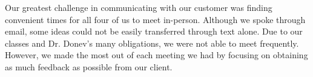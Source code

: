 \documentclass[11pt,a4paper]{article}
\begin{document}
Our greatest challenge in communicating with our customer was finding convenient times for all four of us to meet in-person. Although we spoke through email, some ideas could not be easily transferred through text alone. Due to our classes and Dr. Donev’s many obligations, we were not able to meet frequently. However, we made the most out of each meeting we had by focusing on obtaining as much feedback as possible from our client.
\end{document}
